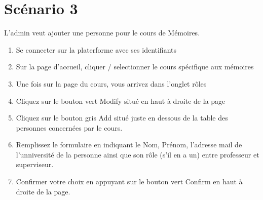 \documentclass[a4paper, 11pt]{article}
\begin{document}
\section*{Scénario 3}
L'admin veut ajouter une personne pour le cours de Mémoires.

\begin{tcolorbox}
    \begin{enumerate}
        \item Se connecter sur la platerforme avec ses identifiants
        \item Sur la page d'accueil, cliquer / selectionner le cours spécifique aux mémoires
        \item Une fois sur la page du cours, vous arrivez dans l'onglet rôles
        \item Cliquez sur le bouton vert \og Modify\fg{} situé en haut à droite de la page
        \item Cliquez sur le bouton gris \og Add\fg{} situé juste en dessous de la table des personnes concernées par le cours.
        \item Remplissez le formulaire en indiquant le Nom, Prénom, l'adresse mail de l'unniversité de la personne ainsi que son rôle (s'il en a un) entre professeur et superviseur.
        \item Confirmer votre choix en appuyant sur le bouton vert \og Confirm\fg{} en haut à droite de la page.
    \end{enumerate}
\end{tcolorbox}
\end{document}
